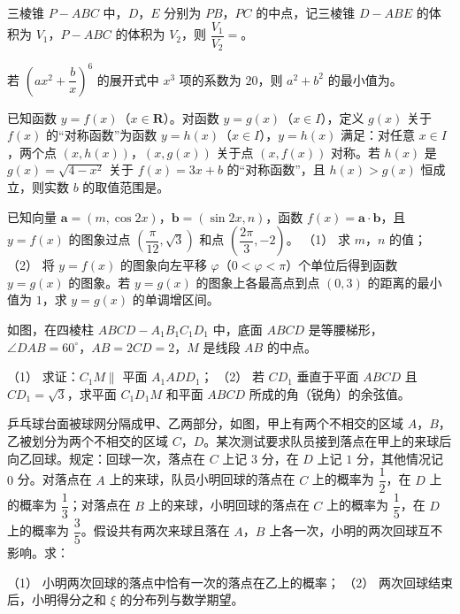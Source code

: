 \begin{question}
三棱锥 $P-ABC$ 中，$D$，$E$ 分别为 $PB$，$PC$ 的中点，记三棱锥 $D-ABE$ 的体积为 $V_1$，$P-ABC$ 的体积为 $V_2$，则 $\dfrac{V_1}{V_2}=$\gkblank{}。
\end{question}
\begin{question}
若 $\left(ax^2+\dfrac bx\right)^6$ 的展开式中 $x^3$ 项的系数为 $20$，则 $a^2+b^2$ 的最小值为\gkblank{}。
\end{question}
\begin{question}
已知函数 $y=f(x)$（$x\in\mathbf R$）。对函数 $y=g(x)$（$x\in I$），定义 $g(x)$ 关于 $f(x)$ 的“对称函数”为函数 $y=h(x)$（$x\in I$），$y=h(x)$ 满足：对任意 $x\in I$，两个点 $(x,h(x))$，$(x,g(x))$ 关于点 $(x,f(x))$ 对称。若 $h(x)$ 是 $g(x)=\sqrt{4-x^2}$ 关于 $f(x)=3x+b$ 的“对称函数”，且 $h(x)>g(x)$ 恒成立，则实数 $b$ 的取值范围是\gkblank{}。
\end{question}
\begin{question}
已知向量 $\boldsymbol a=(m,\cos2x)$，$\boldsymbol b=(\sin2x,n)$，函数 $f(x)=\boldsymbol a\cdot\boldsymbol b$，且 $y=f(x)$ 的图象过点 $\left(\dfrac\pi{12},\sqrt3\right)$ 和点 $\left(\dfrac{2\pi}3,-2\right)$。
（1） 求 $m$，$n$ 的值；
（2） 将 $y=f(x)$ 的图象向左平移 $\varphi$（$0<\varphi<\pi$）个单位后得到函数 $y=g(x)$ 的图象。若 $y=g(x)$ 的图象上各最高点到点 $(0,3)$ 的距离的最小值为 $1$，求 $y=g(x)$ 的单调增区间。
\Needspace{0.4\textheight}
\end{question}
\begin{question}
如图，在四棱柱 $ABCD-A_1B_1C_1D_1$ 中，底面 $ABCD$ 是等腰梯形，$\angle DAB=60^\circ$，$AB=2CD=2$，$M$ 是线段 $AB$ 的中点。
\nopagebreak[4]
\begin{center}\end{center}
\nopagebreak[4]
（1） 求证：$C_1M\parallel$ 平面 $A_1ADD_1$；
（2） 若 $CD_1$ 垂直于平面 $ABCD$ 且 $CD_1=\sqrt3$，求平面 $C_1D_1M$ 和平面 $ABCD$ 所成的角（锐角）的余弦值。
\Needspace{0.4\textheight}
\end{question}
\begin{question}
乒乓球台面被球网分隔成甲、乙两部分，如图，甲上有两个不相交的区域 $A$，$B$，乙被划分为两个不相交的区域 $C$，$D$。某次测试要求队员接到落点在甲上的来球后向乙回球。规定：回球一次，落点在 $C$ 上记 $3$ 分，在 $D$ 上记 $1$ 分，其他情况记 $0$ 分。对落点在 $A$ 上的来球，队员小明回球的落点在 $C$ 上的概率为 $\dfrac12$，在 $D$ 上的概率为 $\dfrac13$；对落点在 $B$ 上的来球，小明回球的落点在 $C$ 上的概率为 $\dfrac15$，在 $D$ 上的概率为 $\dfrac35$。假设共有两次来球且落在 $A$，$B$ 上各一次，小明的两次回球互不影响。求：
\nopagebreak[4]
\begin{center}\end{center}
\nopagebreak[4]
（1） 小明两次回球的落点中恰有一次的落点在乙上的概率；
（2） 两次回球结束后，小明得分之和 $\xi$ 的分布列与数学期望。
\end{question}
